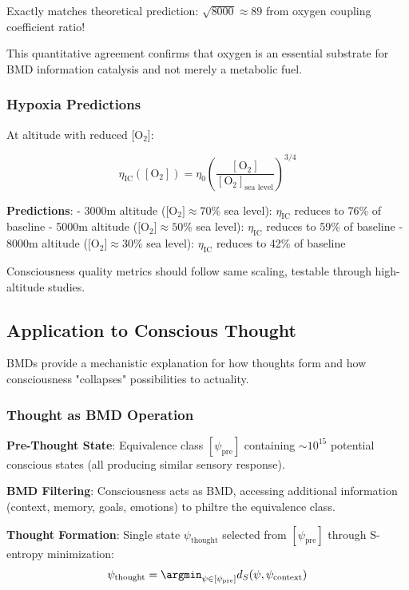 \documentclass[11pt,onecolumn]{article}
\begin{document}
Exactly matches theoretical prediction: $\sqrt{8000} \approx 89$ from oxygen coupling coefficient ratio!

This quantitative agreement confirms that oxygen is an essential substrate for BMD information catalysis and not merely a metabolic fuel.

\subsubsection{Hypoxia Predictions}

At altitude with reduced [O$_2$]:

\begin{equation}
\eta_{\text{IC}}([\text{O}_2]) = \eta_0 \left(\frac{[\text{O}_2]}{[\text{O}_2]_{\text{sea level}}}\right)^{3/4}
\end{equation}

\textbf{Predictions}:
- 3000m altitude ($[$O$_2] \approx 70\%$ sea level): $\eta_{\text{IC}}$ reduces to 76\% of baseline
- 5000m altitude ($[$O$_2] \approx 50\%$ sea level): $\eta_{\text{IC}}$ reduces to 59\% of baseline  
- 8000m altitude ($[$O$_2] \approx 30\%$ sea level): $\eta_{\text{IC}}$ reduces to 42\% of baseline

Consciousness quality metrics should follow same scaling, testable through high-altitude studies.

\subsection{Application to Conscious Thought}

BMDs provide a mechanistic explanation for how thoughts form and how consciousness "collapses" possibilities to actuality.

\subsubsection{Thought as BMD Operation}

\textbf{Pre-Thought State}: Equivalence class $[\psi_{\text{pre}}]$ containing $\sim 10^{15}$ potential conscious states (all producing similar sensory response).

\textbf{BMD Filtering}: Consciousness acts as BMD, accessing additional information (context, memory, goals, emotions) to philtre the equivalence class.

\textbf{Thought Formation}: Single state $\psi_{\text{thought}}$ selected from $[\psi_{\text{pre}}]$ through S-entropy minimization:
\begin{equation}
\psi_{\text{thought}} = \argmin_{\psi \in [\psi_{\text{pre}}]} d_S(\psi, \psi_{\text{context}})
\end{equation}
\end{document}
